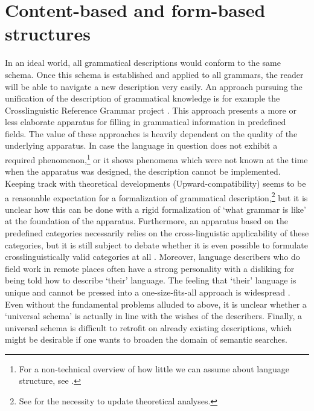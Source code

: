 

\section{Content-based and form-based structures}
In an ideal world, all grammatical descriptions would conform to the same schema. Once this schema is established and applied to all grammars, the reader will be able to navigate a new description very easily. An approach pursuing the unification of the description of grammatical knowledge is for example the Crosslinguistic Reference Grammar project \citep{Peterson2002,Zaefferer2006,Blacktv}. This approach presents a more or less elaborate apparatus for filling in  grammatical information in predefined fields. The value of these approaches is heavily  dependent on the quality of the underlying apparatus. In case the language in question does not exhibit a required phenomenon,\footnote{For 
 a non-technical overview of how little we can assume about language structure, see \citet{EvansEtAl2009BBS}.
} 
or it shows phenomena which were not known at the time when the apparatus was designed, the description cannot be implemented. Keeping track with theoretical developments (Upward-compatibility) seems to be a reasonable expectation for a formalization of grammatical description,\footnote{See 
 \citet{Mosel2006craft} for the necessity to update theoretical analyses.
} 
but it is unclear how this can be done with a rigid formalization of `what grammar is like' at the foundation of the apparatus.  Furthermore, an apparatus based on the predefined categories necessarily relies on the cross-linguistic applicability of these categories, but it is still subject to debate whether it is even possible to formulate crosslinguistically valid categories at all \citep{Haspelmath2007LT}. Moreover, language describers who do field work in remote places often have a strong personality with a disliking for being told how to describe `their' language. The feeling that `their' language is unique and cannot be pressed into a one-size-fits-all approach is widespread \citep{Weber2006grow}. Even without the fundamental problems alluded to above, it is unclear whether a `universal schema' is actually in line with the wishes of the describers. Finally, a universal schema is difficult to retrofit on already existing descriptions, which might be desirable if one wants to broaden the domain of semantic searches.

